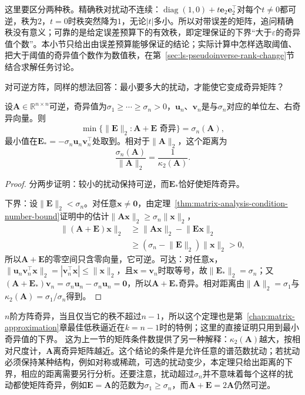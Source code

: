 这里要区分两种秩。精确秩对扰动不连续：$\operatorname{diag}(1,0)+t\bm e_2\bm e_2^\top$对每个$t\neq0$都可逆，秩为$2$，$t=0$时秩突然降为$1$，无论$|t|$多小。所以对带误差的矩阵，追问精确秩没有意义；可靠的是给定误差预算下的有效秩，即定理保证的下界“大于$\varepsilon$的奇异值个数”。本小节只给出由误差预算能够保证的结论；实际计算中怎样选取阈值、把大于阈值的奇异值个数作为数值秩，在第~\ref{sec:ls-pseudoinverse-rank-change}节结合求解任务讨论。

对可逆方阵，同样的想法回答：最小要多大的扰动，才能使它变成奇异矩阵？
\begin{theorem}[到奇异矩阵的距离]
\label{thm:ls-distance-to-singularity}
设$\bm A\in\mathbb R^{n\times n}$可逆，奇异值为$\sigma_1\geq\cdots\geq\sigma_n>0$，$\bm u_n$、$\bm v_n$是与$\sigma_n$对应的单位左、右奇异向量。则
\[
 \min\{\lVert\bm E\rVert_2:\bm A+\bm E\text{ 奇异}\}=\sigma_n(\bm A),
\]
最小值在$\bm E_*=-\sigma_n\bm u_n\bm v_n^\top$处取到。相对于$\lVert\bm A\rVert_2$，这个距离为
\[
 \frac{\sigma_n(\bm A)}{\lVert\bm A\rVert_2}=\frac1{\kappa_2(\bm A)} .
\]
\end{theorem}
\begin{proof}
分两步证明：较小的扰动保持可逆，而$\bm E_*$恰好使矩阵奇异。

下界：设$\lVert\bm E\rVert_2<\sigma_n$。对任意$\bm x\neq\bm0$，由定理~\ref{thm:matrix-analysis-condition-number-bound}证明中的估计$\lVert\bm A\bm x\rVert_2\geq\sigma_n\lVert\bm x\rVert_2$，
\[
 \begin{aligned}
 \lVert(\bm A+\bm E)\bm x\rVert_2
 &\geq\lVert\bm A\bm x\rVert_2-\lVert\bm E\bm x\rVert_2\\
 &\geq(\sigma_n-\lVert\bm E\rVert_2)\lVert\bm x\rVert_2>0 ,
 \end{aligned}
\]
所以$\bm A+\bm E$的零空间只含零向量，它可逆。可达：对任意$\bm x$，$\lVert\bm u_n\bm v_n^\top\bm x\rVert_2=|\bm v_n^\top\bm x|\leq\lVert\bm x\rVert_2$，且$\bm x=\bm v_n$时取等号，故$\lVert\bm E_*\rVert_2=\sigma_n$；又$(\bm A+\bm E_*)\bm v_n=\sigma_n\bm u_n-\sigma_n\bm u_n=\bm0$，所以$\bm A+\bm E_*$奇异。相对距离由$\lVert\bm A\rVert_2=\sigma_1$与$\kappa_2(\bm A)=\sigma_1/\sigma_n$得到。
\end{proof}
$n$阶方阵奇异，当且仅当它的秩不超过$n-1$，所以这个定理也是第~\ref{chap:matrix-approximation}章最佳低秩逼近在$k=n-1$时的特例；这里的直接证明只用到最小奇异值的下界。
这为上一节的矩阵条件数提供了另一种解释：$\kappa_2(\bm A)$越大，按相对尺度计，$\bm A$离奇异矩阵越近。这个结论的条件是允许任意的谱范数扰动；若扰动必须保持某种结构，例如对称或稀疏，可选的扰动变少，本定理只给出距离的下界，相应的距离需要另行分析。还要注意，扰动超过$\sigma_n$并不意味着每个这样的扰动都使矩阵奇异，例如$\bm E=\bm A$的范数为$\sigma_1\geq\sigma_n$，而$\bm A+\bm E=2\bm A$仍然可逆。

